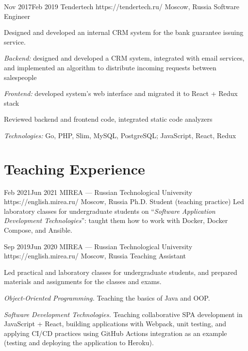 \documentclass[10pt]{article}
\begin{document}
\job
	{Nov 2017}{Feb 2019}
	{Tendertech}
	{https://tendertech.ru/}
	{Moscow, Russia}
	{Software Engineer}
	{
	  Designed and developed an internal CRM system for the bank guarantee issuing service.

	  \begin{supercompactitemize}
		\item \textit{Backend:} designed and developed a CRM system, integrated with email services, and implemented an algorithm to distribute incoming requests between salespeople
		\item \textit{Frontend:} developed system's web interface and migrated it to React + Redux stack
		\item Reviewed backend and frontend code, integrated static code analyzers
	  \end{supercompactitemize}

	  \textit{Technologies:} Go, PHP, Slim, MySQL, PostgreSQL; JavaScript, React, Redux
	}


\section{Teaching Experience}

\job
	{Feb 2021}{Jun 2021}
	{MIREA --- Russian Technological University}
	{https://english.mirea.ru/}
	{Moscow, Russia}
	{Ph.D. Student (teaching practice)}
	{
	  Led laboratory classes for undergraduate students on ``\textit{Software Application Development Technologies}'': taught them how to work with Docker, Docker Compose, and Ansible.
	}

\job
	{Sep 2019}{Jun 2020}
	{MIREA --- Russian Technological University}
	{https://english.mirea.ru/}
	{Moscow, Russia}
	{Teaching Assistant}
	{
	  Led practical and laboratory classes for undergraduate students, and prepared materials and assignments for the classes and exams.

	  \begin{supercompactitemize}
	  	\item \textit{Object-Oriented Programming.} Teaching the basics of Java and OOP.
	  	\item \textit{Software Development Technologies.} Teaching collaborative SPA development in JavaScript + React, building applications with Webpack, unit testing, and applying CI/CD practices using GitHub Actions integration as an example (testing and deploying the application to Heroku).
	  \end{supercompactitemize}
	}
\end{document}
